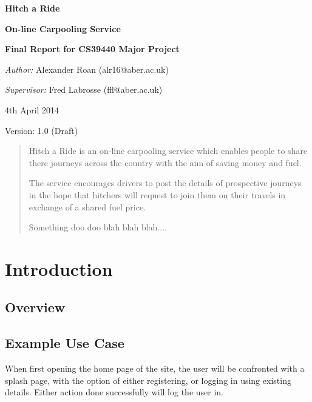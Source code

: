 \documentclass[11pt]{article}
\begin{document}
\begin{titlepage}
\begin{center}
	\vspace*{2cm}
	\Huge
	\textbf{Hitch a Ride}
	\vspace{0.5cm}
	
	\LARGE
	\textbf{On-line Carpooling Service}		
	\vspace{2cm}
	
	\Large
	\textbf{Final Report for CS39440 Major Project}	
	\vspace{0.5cm}
	
	\normalsize
	\textsl{Author: }Alexander Roan (alr16@aber.ac.uk)
	
	\textsl{Supervisor: }Fred Labrosse (ffl@aber.ac.uk)	
	\vspace{2cm}
	
	4th April 2014
	
	Version: 1.0 (Draft)	
\end{center}
\end{titlepage}

\begin{abstract}
Hitch a Ride is an on-line carpooling service which enables people to share there journeys across the country with the aim of saving money and fuel.

The service encourages drivers to post the details of prospective journeys in the hope that hitchers will request to join them on their travels in exchange of a shared fuel price. 

Something doo doo blah blah blah....

\end{abstract}

\newpage

\tableofcontents
\newpage
\section{Introduction}
	\subsection{Overview}
	\subsection{Example Use Case}
	When first opening the home page of the site, the user will be confronted with a splash page, with the option of either registering, or logging in using existing details. Either action done successfully will log the user in.
	
\end{document}
